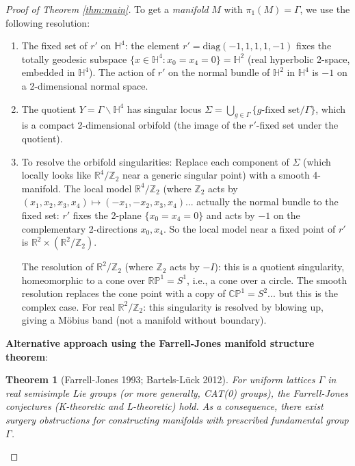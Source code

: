 \documentclass[12pt]{article}
\newtheorem{theorem}{Theorem}
\theoremstyle{definition}
\begin{document}
\begin{proof}[Proof of Theorem \ref{thm:main}]
To get a \emph{manifold} $M$ with $\pi_1(M) = \Gamma$, we use the following resolution:

\begin{enumerate}
\item The fixed set of $r'$ on $\mathbb{H}^4$: the element $r' = \mathrm{diag}(-1,1,1,1,-1)$ fixes the totally geodesic subspace $\{x\in\mathbb{H}^4 : x_0 = x_4 = 0\} = \mathbb{H}^2$ (real hyperbolic 2-space, embedded in $\mathbb{H}^4$). The action of $r'$ on the normal bundle of $\mathbb{H}^2$ in $\mathbb{H}^4$ is $-1$ on a 2-dimensional normal space.

\item The quotient $Y = \Gamma\backslash\mathbb{H}^4$ has singular locus $\Sigma = \bigcup_{g\in\Gamma}\{g\text{-fixed set}/\Gamma\}$, which is a compact 2-dimensional orbifold (the image of the $r'$-fixed set under the quotient).

\item To resolve the orbifold singularities: Replace each component of $\Sigma$ (which locally looks like $\mathbb{R}^4/\mathbb{Z}_2$ near a generic singular point) with a smooth 4-manifold. The local model $\mathbb{R}^4/\mathbb{Z}_2$ (where $\mathbb{Z}_2$ acts by $(x_1,x_2,x_3,x_4)\mapsto(-x_1,-x_2,x_3,x_4)$... actually the normal bundle to the fixed set: $r'$ fixes the 2-plane $\{x_0=x_4=0\}$ and acts by $-1$ on the complementary 2-directions $x_0,x_4$. So the local model near a fixed point of $r'$ is $\mathbb{R}^2\times(\mathbb{R}^2/\mathbb{Z}_2)$.

The resolution of $\mathbb{R}^2/\mathbb{Z}_2$ (where $\mathbb{Z}_2$ acts by $-I$): this is a quotient singularity, homeomorphic to a cone over $\mathbb{RP}^1 = S^1$, i.e., a cone over a circle. The smooth resolution replaces the cone point with a copy of $\mathbb{CP}^1 = S^2$... but this is the complex case. For real $\mathbb{R}^2/\mathbb{Z}_2$: this singularity is resolved by blowing up, giving a Möbius band (not a manifold without boundary).
\end{enumerate}

\textbf{Alternative approach using the Farrell-Jones manifold structure theorem}:

\begin{theorem}[Farrell-Jones 1993; Bartels-L\"{u}ck 2012]\label{thm:FJ}
For uniform lattices $\Gamma$ in real semisimple Lie groups (or more generally, CAT(0) groups), the Farrell-Jones conjectures (K-theoretic and L-theoretic) hold. As a consequence, there exist surgery obstructions for constructing manifolds with prescribed fundamental group $\Gamma$.
\end{theorem}


\end{proof}
\end{document}
